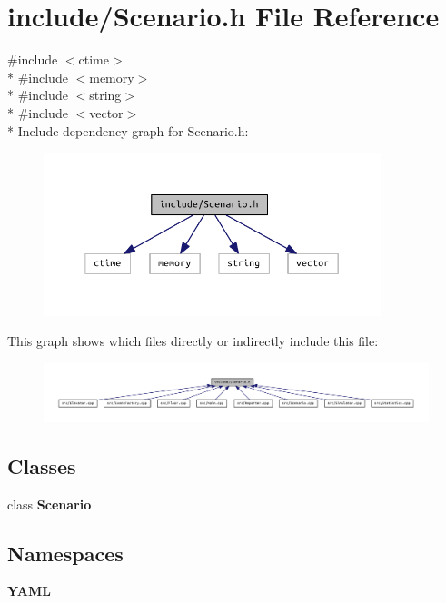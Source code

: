 \section{include/\+Scenario.h File Reference}
\label{_scenario_8h}
{\ttfamily \#include $<$ctime$>$}\\*
{\ttfamily \#include $<$memory$>$}\\*
{\ttfamily \#include $<$string$>$}\\*
{\ttfamily \#include $<$vector$>$}\\*
Include dependency graph for Scenario.\+h\+:\nopagebreak
\begin{figure}[H]
\begin{center}
\leavevmode
\includegraphics[width=278pt]{_scenario_8h__incl}
\end{center}
\end{figure}
This graph shows which files directly or indirectly include this file\+:\nopagebreak
\begin{figure}[H]
\begin{center}
\leavevmode
\includegraphics[width=350pt]{_scenario_8h__dep__incl}
\end{center}
\end{figure}
\subsection*{Classes}
\begin{DoxyCompactItemize}
\item 
class {\bf Scenario}
\end{DoxyCompactItemize}
\subsection*{Namespaces}
\begin{DoxyCompactItemize}
\item 
 {\bf Y\+A\+M\+L}
\end{DoxyCompactItemize}
